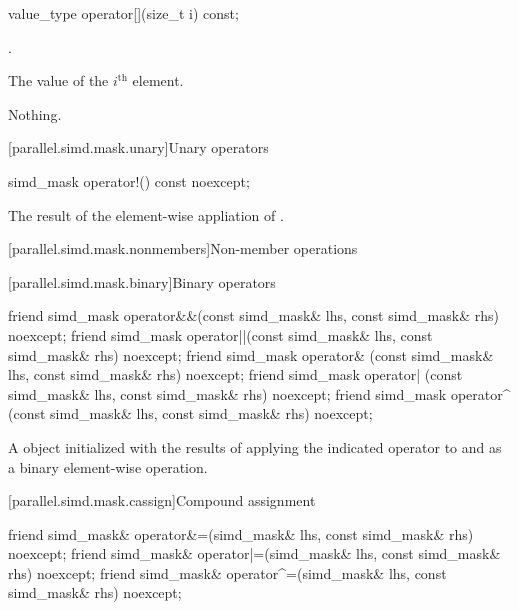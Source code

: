 \begin{itemdecl}
value_type operator[](size_t i) const;
\end{itemdecl}

\begin{itemdescr}
  \pnum\requires
  .

  \pnum\returns
  The value of the $i^\text{th}$ element.

  \pnum\throws Nothing.
\end{itemdescr}

[parallel.simd.mask.unary]{Unary operators}

\begin{itemdecl}
simd_mask operator!() const noexcept;
\end{itemdecl}

\begin{itemdescr}
  \pnum\returns
  The result of the element-wise appliation of .
\end{itemdescr}

[parallel.simd.mask.nonmembers]{Non-member operations}

[parallel.simd.mask.binary]{Binary operators}

\begin{itemdecl}
friend simd_mask operator&&(const simd_mask& lhs, const simd_mask& rhs) noexcept;
friend simd_mask operator||(const simd_mask& lhs, const simd_mask& rhs) noexcept;
friend simd_mask operator& (const simd_mask& lhs, const simd_mask& rhs) noexcept;
friend simd_mask operator| (const simd_mask& lhs, const simd_mask& rhs) noexcept;
friend simd_mask operator^ (const simd_mask& lhs, const simd_mask& rhs) noexcept;
\end{itemdecl}

\begin{itemdescr}
  \pnum\returns
  A  object initialized with the results of applying the indicated operator to  and  as a binary element-wise operation.
\end{itemdescr}

[parallel.simd.mask.cassign]{Compound assignment}

\begin{itemdecl}
friend simd_mask& operator&=(simd_mask& lhs, const simd_mask& rhs) noexcept;
friend simd_mask& operator|=(simd_mask& lhs, const simd_mask& rhs) noexcept;
friend simd_mask& operator^=(simd_mask& lhs, const simd_mask& rhs) noexcept;
\end{itemdecl}

